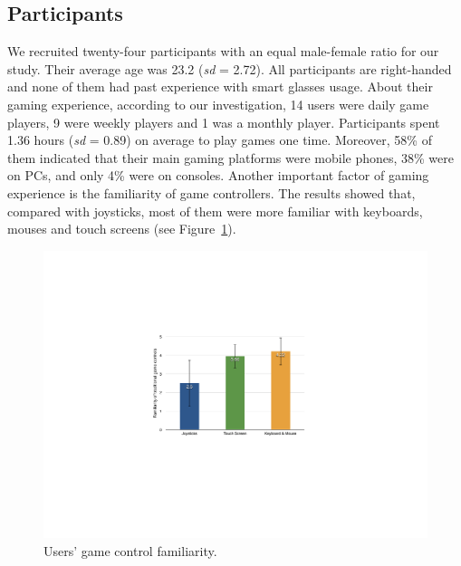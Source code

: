 \documentclass{sigchi}
\begin{document}
  \subsection {Participants}
  We recruited twenty-four participants with an equal male-female ratio for our study. Their average age was 23.2 (\textsl{sd} = 2.72). All participants are right-handed and none of them had past experience with smart glasses usage. About their gaming experience, according to our investigation, 14 users were daily game players, 9 were weekly players and 1 was a monthly player. Participants spent 1.36 hours (\textsl{sd} = 0.89) on average to play games one time. Moreover, 58\% of them indicated that their main gaming platforms were mobile phones, 38\% were on PCs, and only 4\% were on consoles. Another important factor of gaming experience is the familiarity of game controllers. The results showed that, compared with joysticks, most of them were more familiar with keyboards, mouses and touch screens (see Figure~\ref{fig:figureFamiliarity}).
  \begin{figure}[!h]
  \centering
  \includegraphics[width=1\columnwidth]{Familiarity.pdf}
  \caption{Users' game control familiarity.}
  \label{fig:figureFamiliarity}
  \end{figure}   
\end{document}
